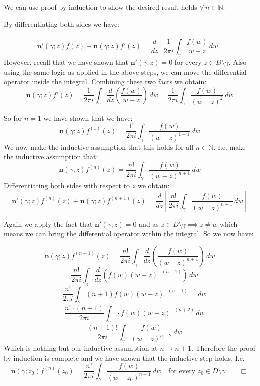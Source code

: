 \documentclass[12pt]{article}
\begin{document}
\noindent We can use proof by induction to show the desired result holds  \(\forall \, n \in \mathbb{N}\).

\noindent By differentiating both sides we have:

\[
    \mathbf{n}'(\gamma;z)f(z) + \mathbf{n}(\gamma;z)f'(z) = \frac{d}{dz} \left[\frac{1}{2\pi i} \int_\gamma  \frac{f(w)}{w - z} \, dw\right]
\]
However, recall that we have shown that \(\mathbf{n}'(\gamma;z) = 0 \) for every \(z \in D \setminus \gamma\). Also using the same logic as applied in the above steps, we can move the differential operator inside the integral. Combining these two facts we obtain:
\[
    \mathbf{n}(\gamma;z)f'(z) = \frac{1}{2\pi i} \int_{\gamma} \frac{d}{dz} \left(\frac{f(w)}{w-z}\right)\,dw = \frac{1}{2\pi i} \int_{\gamma}  \frac{f(w)}{\left(w-z\right)^2}\,dw
\]

\noindent So for \(n = 1\) we have shown that we have:
\[
    \mathbf{n}(\gamma;z)f^{(1)}(z) = \frac{1!}{2\pi i} \int_{\gamma} \frac{f(w)}{\left(w-z\right)^{1+1}} \, dw
\]
We now make the inductive assumption that this holds for all \(n \in \mathbb{N}\). I.e. make the inductive assumption that:
\[
\mathbf{n}\left(\gamma;z\right)f^{\left(n\right)}\left(z\right) = \frac{n!}{2\pi i} \int_{\gamma} \frac{f\left(w\right)}{\left(w-z\right)^{n+1}} \, dw
\]
Differentiating both sides with respect to \(z\) we obtain:
\[
    \mathbf{n}'(\gamma;z)f^{(n)}(z) + \mathbf{n}(\gamma;z)f^{(n+1)}(z) = \frac{d}{dz} \left[\frac{n!}{2\pi i} \int_{\gamma} \frac{f\left(w\right)}{\left(w-z\right)^{n+1}} \, dw\right]
\]

\noindent Again we apply the fact that \(\mathbf{n}'(\gamma;z) = 0\) and as \(z \in D \setminus \gamma \implies z \neq w\) which means we can bring the differential operator within the integral. So we now have:

\[
    \mathbf{n}(\gamma;z)f^{(n+1)}(z) = \frac{n!}{2\pi i}\int_{\gamma} \frac{d}{dz} \left( \frac{f\left(w\right)}{\left(w-z\right)^{n+1}}\right)\, dw
\]
\[
= \frac{n!}{2\pi i}\int_{\gamma} \frac{d}{dz} \left( f\left(w\right)\left(w-z\right)^{-(n+1)}\right)\, dw
\]
\[
    = \frac{n!}{2\pi i}\int_{\gamma} \left(n+1\right)  f\left(w\right)\left(w-z\right)^{-(n+1)-1}\, dw
\]
\[
    = \frac{n!\cdot\left(n+1\right) }{2\pi i}\int_{\gamma} \cdot f\left(w\right)\left(w-z\right)^{-(n+2)}\, dw
\]
\[
    = \frac{\left(n+1\right)! }{2\pi i}\int_{\gamma}  \frac{f\left(w\right)}{\left(w-z\right)^{n+2}}\, dw
\]
Which is nothing but our inductive assumption at \(n \rightarrow n+1\). Therefore the proof by induction is complete and we have shown that the inductive step holds. I.e.
\[
    \mathbf{n}\left(\gamma;z_0\right)f^{\left(n\right)}\left(z_0\right) = \frac{n!}{2\pi i} \int_{\gamma} \frac{f\left(w\right)}{\left(w-z_0\right)^{n+1}} \, dw \quad \text{for every } z_0 \in D \setminus \gamma \qquad \Box
\]
\end{document}
